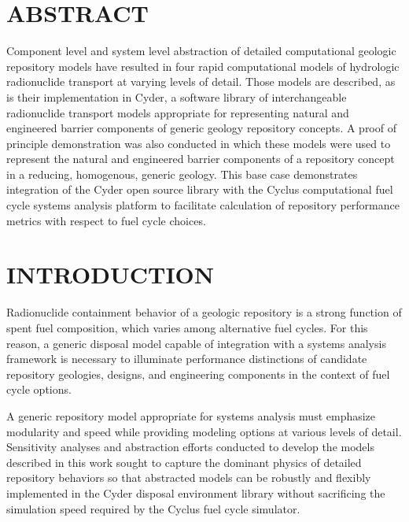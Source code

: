 \documentclass[letterpaper, 11pt]{article}
\begin{document}
\section*{ABSTRACT}

Component level and system level abstraction of detailed computational geologic 
repository models have resulted in four rapid computational models of hydrologic 
radionuclide transport at varying levels of detail. Those models are described, 
as is their implementation in Cyder, a software library of 
interchangeable radionuclide transport models appropriate for representing 
natural and engineered barrier components of generic geology repository 
concepts. A proof of principle demonstration was also conducted in which these models 
were used to represent the natural and engineered barrier components of a 
repository concept in a reducing, homogenous, generic geology. 
This base case demonstrates integration of the Cyder open source library with the Cyclus 
computational fuel cycle systems analysis platform to facilitate calculation of
repository performance metrics with respect to fuel cycle choices.

\section*{INTRODUCTION}
Radionuclide containment behavior of a geologic repository is a strong function 
of spent fuel composition, which varies among alternative fuel cycles. For this 
reason, a generic disposal model capable of integration with a systems analysis 
framework is necessary to illuminate performance distinctions of candidate 
repository geologies, designs, and engineering components in the context of fuel 
cycle options. 

A generic repository model appropriate for systems analysis must emphasize 
modularity and speed while providing modeling options at various levels of 
detail. Sensitivity analyses and abstraction efforts conducted to develop the 
models described in this work sought to capture the dominant physics of detailed 
repository behaviors so that abstracted models can be robustly and flexibly 
implemented in the Cyder disposal environment library without sacrificing the 
simulation speed required by the Cyclus fuel cycle simulator.
\end{document}
